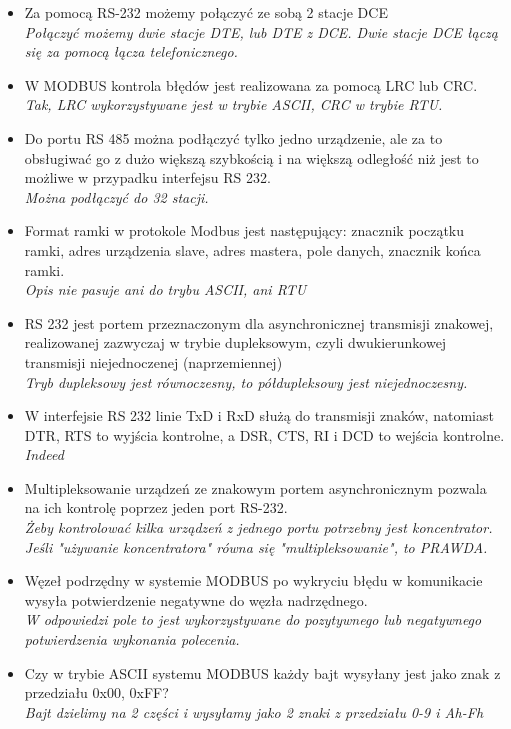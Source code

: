 \begin{itemize}
	\item \textcolor{nie}{Za pomocą RS-232 możemy połączyć ze sobą 2 stacje DCE} \\
	{\small \emph{Połączyć możemy dwie stacje DTE, lub DTE z DCE. Dwie stacje DCE łączą się za pomocą łącza telefonicznego.}}
	
	\item \textcolor{tak}{W MODBUS kontrola błędów jest realizowana za pomocą LRC lub CRC.} \\
	{\small \emph{Tak, LRC wykorzystywane jest w trybie ASCII, CRC w trybie RTU.}}
	
	\item \textcolor{nie}{Do portu RS 485 można podłączyć tylko jedno urządzenie, ale za to obsługiwać go z dużo większą szybkością i na większą odległość niż jest to możliwe w przypadku interfejsu RS 232.} \\
	{\small \emph{Można podłączyć do 32 stacji.}}
	
	\item \textcolor{nie}{Format ramki w protokole Modbus jest następujący: znacznik początku ramki, adres urządzenia slave, adres mastera, pole danych, znacznik końca ramki.} \\
	{\small \emph{Opis nie pasuje ani do trybu ASCII, ani RTU}}
	
	\item \textcolor{nie}{RS 232 jest portem przeznaczonym dla asynchronicznej transmisji znakowej, realizowanej zazwyczaj w trybie dupleksowym, czyli dwukierunkowej transmisji niejednoczenej (naprzemiennej)} \\
	{\small \emph{Tryb dupleksowy jest równoczesny, to półdupleksowy jest niejednoczesny.}}
	
	\item \textcolor{tak}{W interfejsie RS 232 linie TxD i RxD służą do transmisji znaków, natomiast DTR, RTS to wyjścia kontrolne, a DSR, CTS, RI i DCD to wejścia kontrolne.} \\
	{\small \emph{Indeed}}
	
	\item \textcolor{tak}{Multipleksowanie urządzeń ze znakowym portem asynchronicznym pozwala na ich kontrolę poprzez jeden port RS-232.} \\
	{\small \emph{Żeby kontrolować kilka urządzeń z jednego portu potrzebny jest koncentrator. Jeśli "używanie koncentratora" równa się "multipleksowanie", to PRAWDA.}}
	
	\item \textcolor{tak}{Węzeł podrzędny w systemie MODBUS po wykryciu błędu w komunikacie wysyła potwierdzenie negatywne	do węzła nadrzędnego.} \\
	{\small \emph{W odpowiedzi pole to jest wykorzystywane do pozytywnego lub negatywnego potwierdzenia wykonania polecenia.}}
	
	\item \textcolor{nie}{Czy w trybie ASCII systemu MODBUS każdy bajt wysyłany jest jako znak z przedziału 0x00, 0xFF?} \\
	{\small \emph{Bajt dzielimy na 2 części i wysyłamy jako 2 znaki z przedziału 0-9 i Ah-Fh}}
		
	
\end{itemize}


